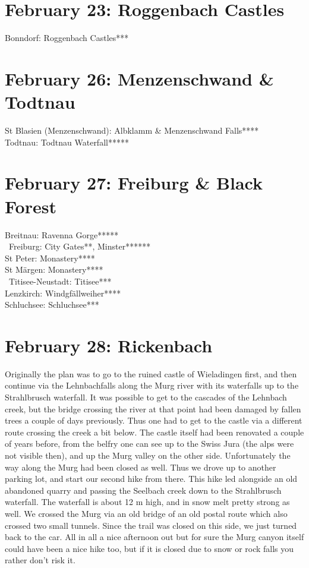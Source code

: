 \section{February 23: Roggenbach Castles}
\label{2021:Roggenbach}

Bonndorf: Roggenbach Castles***

\section{February 26: Menzenschwand \& Todtnau}
\label{2021:Todtnau}

St Blasien (Menzenschwand): Albklamm \& Menzenschwand Falls****\\
Todtnau: Todtnau Waterfall*****

\section{February 27: Freiburg \& Black Forest}
\label{2021:Freiburg}

Breitnau: Ravenna Gorge*****\\\
Freiburg: City Gates**, Minster******\\
St Peter: Monastery****\\
St M\"argen: Monastery****\\\
Titisee-Neustadt: Titisee***\\
Lenzkirch: Windgf\"allweiher****\\
Schluchsee: Schluchsee***

\section{February 28: Rickenbach}
\label{2021:Rickenbach}

Originally the plan was to go to the ruined castle of Wieladingen first, and then continue via the Lehnbachfalls along the Murg river with its waterfalls up to the Strahlbrusch waterfall. It was possible to get to the cascades of the Lehnbach creek, but the bridge crossing the river at that point had been damaged by fallen trees a couple of days previously. Thus one had to get to the castle via a different route crossing the creek a bit below. The castle itself had been renovated a couple of years before, from the belfry one can see up to the Swiss Jura (the alps were not visible then), and up the Murg valley on the other side. Unfortunately the way along the Murg had been closed as well. Thus we drove up to another parking lot, and start our second hike from there. This hike led alongside an old abandoned quarry and passing the Seelbach creek down to the Strahlbrusch waterfall. The waterfall is about 12 m high, and in snow melt pretty strong as well. We crossed the Murg via an old bridge of an old postal route which also crossed two small tunnels. Since the trail was closed on this side, we just turned back to the car. All in all a nice afternoon out but for sure the Murg canyon itself could have been a nice hike too, but if it is closed due to snow or rock falls you rather don't risk it.\\


